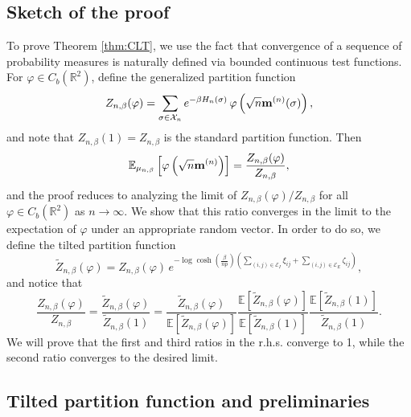 \documentclass[11pt,oneside]{amsart}
\numberwithin{equation}{section}  %
\theoremstyle{plain}
\theoremstyle{remark}
\def \E {{\mathbb E}}
\def \cE {\mathcal{E}}
\def \bm {{\bf m}}
\begin{document}
\subsection{Sketch of the proof}
To prove Theorem \ref{thm:CLT}, we use the fact that convergence of a sequence of probability measures is naturally defined via bounded continuous test functions. For $\varphi \in C_b(\mathbb{R}^2)$, define the generalized partition function
\begin{equation}
\label{def:ZN}
Z_{n,\beta}(\varphi) = \sum_{\sigma \in \mathcal{X}_n} 
e^{-\beta H_n(\sigma)} \, \varphi\left(\sqrt{n} \bm^{(n)}(\sigma) \right),
\end{equation}
and note that $Z_{n,\beta}(1) = Z_{n,\beta}$ is the standard partition function. Then
\begin{equation*}
\mathbb{E}_{\mu_{n,\beta}}\left[\varphi\left(\sqrt{n}\bm^{(n)}\right)\right] =\frac{Z_{n,\beta}(\varphi)}{Z_{n,\beta}},
\end{equation*}
and the proof reduces to analyzing the limit of $Z_{n,\beta}(\varphi)/Z_{n,\beta}$ for all $\varphi \in C_b(\mathbb{R}^2)$ as $n \to \infty$. We show that this ratio converges in the limit to the expectation of $\varphi$ under an appropriate random vector. In order to do so, we define the tilted partition function
\begin{equation*}
\label{def:ZNtilted}
\widetilde{Z}_{n,\beta}(\varphi) = Z_{n,\beta}(\varphi) \, e^{-\log \cosh\left(\frac{\beta}{np}\right) \left(\sum_{(i,j) \in \cE_I} \xi_{ij} + \sum_{(i,j) \in \cE_E} \zeta_{ij}\right)},
\end{equation*}
and notice that 
\begin{equation*}
\frac{Z_{n,\beta}(\varphi)}{Z_{n,\beta}} = \frac{\widetilde{Z}_{n,\beta}(\varphi)}{\widetilde{Z}_{n,\beta}(1)} = \frac{\widetilde{Z}_{n,\beta}(\varphi)}{\E[\widetilde{Z}_{n,\beta}(\varphi)]} \frac{\E[\widetilde{Z}_{n,\beta}(\varphi)]}{\E[\widetilde{Z}_{n,\beta}(1)]} \frac{\E[\widetilde{Z}_{n,\beta}(1)]}{\widetilde{Z}_{n,\beta}(1)}.
\end{equation*}
We will prove that the first and third ratios in the r.h.s. converge to 1, while the second ratio converges to the desired limit. 

\subsection{Tilted partition function and preliminaries}
\end{document}
